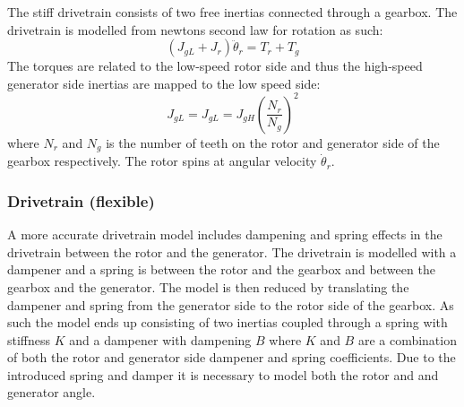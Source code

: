 The stiff drivetrain consists of two free inertias connected through a gearbox. The drivetrain is modelled from newtons second law for rotation as such:
\begin{equation}\label{eq:wtlin_comp_drivetrain}
	(J_{gL} + J_{r}) \ddot{\theta}_r = T_{r} + T_{g}
\end{equation}
The torques are related to the low-speed rotor side and thus the high-speed generator side inertias are mapped to the low speed side:
\begin{equation} \label{eq:wtlin_comp_inertiamap}
	J_{gL} = J_{gL} = J_{gH} \left(\dfrac{N_r}{N_g}\right)^2
\end{equation}
where $ N_r $ and $ N_g $ is the number of teeth on the rotor and generator side of the gearbox respectively. The rotor spins at angular velocity $ \dot{\theta}_r $.


\subsubsection{Drivetrain (flexible)}
A more accurate drivetrain model includes dampening and spring effects in the drivetrain between the rotor and the generator. The drivetrain is modelled with a dampener and a spring is between the rotor and the gearbox and between the gearbox and the generator. The model is then reduced by translating the dampener and spring from the generator side to the rotor side of the gearbox. As such the model ends up consisting of two inertias coupled through a spring with stiffness $ K $ and a dampener with dampening $ B $ where $ K $ and $ B $ are a combination of both the rotor and generator side dampener and spring coefficients. Due to the introduced spring and damper it is necessary to model both the rotor and and generator angle. 

